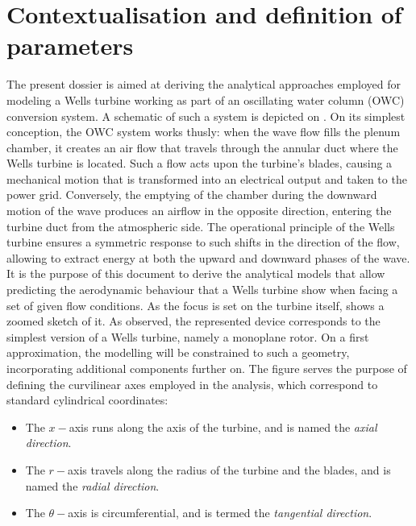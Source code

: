 
\section*{Contextualisation and definition of parameters}{\label{sec:contextualisation_definition_parameters}}
\noindent The present dossier is aimed at deriving the analytical approaches employed for modeling a Wells turbine working as part of an oscillating water column (OWC) conversion system. A schematic of such a system is depicted on . On its simplest conception, the OWC system works thusly: when the wave flow fills the plenum chamber, it creates an air flow that travels through the annular duct where the Wells turbine is located. Such a flow acts upon the turbine's blades, causing a mechanical motion that is transformed into an electrical output and taken to the power grid. Conversely, the emptying of the chamber during the downward motion of the wave produces an airflow in the opposite direction, entering the turbine duct from the atmospheric side. The operational principle of the Wells turbine ensures a symmetric response to such shifts in the direction of the flow, allowing to extract energy at both the upward and downward phases of the wave.\\
It is the purpose of this document to derive the analytical models that allow predicting the aerodynamic behaviour that a Wells turbine show when facing a set of given flow conditions. As the focus is set on the turbine itself,  shows a zoomed sketch of it. As observed, the represented device corresponds to the simplest version of a Wells turbine, namely a monoplane rotor. On a first approximation, the modelling will be constrained to such a geometry, incorporating additional components further on. The figure serves the purpose of defining the curvilinear axes employed in the analysis, which correspond to standard cylindrical coordinates:
\begin{itemize}
	\item{The $x-$axis runs along the axis of the turbine, and is named the \emph{axial direction}.}
	\item{The $r-$axis travels along the radius of the turbine and the blades, and is named the \emph{radial direction}.}
	\item{The $\theta-$axis is circumferential, and is termed the \emph{tangential direction}.}
\end{itemize}
